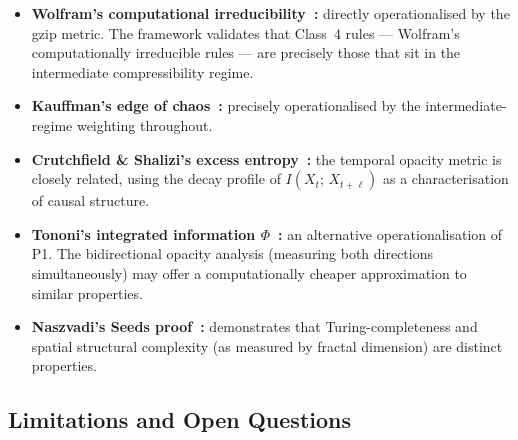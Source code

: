 \documentclass[12pt,a4paper]{article}
\begin{document}
\begin{itemize}[noitemsep]
  \item \textbf{Wolfram's computational irreducibility~\cite{wolfram2002}:}
    directly operationalised by the gzip metric.
    The framework validates that Class~4 rules --- Wolfram's
    computationally irreducible rules --- are precisely those that sit
    in the intermediate compressibility regime.

  \item \textbf{Kauffman's edge of chaos~\cite{kauffman1993,langton1990}:}
    precisely operationalised by the intermediate-regime weighting
    throughout.

  \item \textbf{Crutchfield \& Shalizi's excess entropy~\cite{crutchfield2001}:}
    the temporal opacity metric is closely related, using the decay
    profile of $I(X_t;\,X_{t+\ell})$ as a characterisation of causal
    structure.

  \item \textbf{Tononi's integrated information $\Phi$~\cite{tononi2004}:}
    an alternative operationalisation of P1.
    The bidirectional opacity analysis (measuring both directions
    simultaneously) may offer a computationally cheaper approximation
    to similar properties.

  \item \textbf{Naszvadi's Seeds proof~\cite{naszvadi2020}:}
    demonstrates that Turing-completeness and spatial structural
    complexity (as measured by fractal dimension) are distinct
    properties.
\end{itemize}

\subsection{Limitations and Open Questions}
\end{document}
